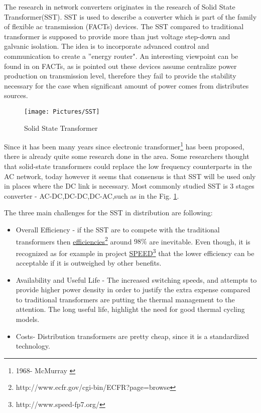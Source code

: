 \documentclass[]{scrartcl}
\begin{document}
The research in network converters originates in the research of Solid State Transformer(SST). SST is used to describe a converter which is part of the family of flexible ac transmission (FACTs) devices. The SST compared to traditional transformer is supposed to provide more than just voltage step-down and galvanic isolation. The idea is to incorporate advanced control and communication to create a ''energy router"\cite{She2012}. An interesting viewpoint can be found in \cite{Doncker2014} on FACTs, as is pointed out these devices assume centralize power production on transmission level, therefore they fail to provide the stability necessary for the case when significant amount of power comes from distributes sources.


\begin{figure}[h!]
	\centering
	\texttt{[image: Pictures/SST]}
	\caption{Solid State Transformer}
	\label{fig:SST}
\end{figure}

Since it has been many years since electronic transformer\footnote{1968- McMurray \cite{McMurray1971}} has been proposed, there is already quite some research done in the area. Some researchers thought that solid-state transformers could replace the low frequency counterparts in the AC network, today however it seems that consensus is that SST will be used only in places where the DC link is necessary\cite{Kolar2014d}. Most commonly studied SST is 3 stages converter - AC-DC,DC-DC,DC-AC,such as in the Fig. \ref{fig:SST}. 



The three main challenges for the SST in distribution are following\cite{Huang2013}:
\begin{itemize}
	\item Overall Efficiency - if the SST are to compete with the traditional transformers then \href{<http://www.ecfr.gov/cgi-bin/ECFR?page=browse>}{efficiencies}\footnote{http://www.ecfr.gov/cgi-bin/ECFR?page=browse} around $98\%$ are inevitable. Even though, it is recognized as for example in project \href{<http://www.speed-fp7.org/>}{SPEED}\footnote{http://www.speed-fp7.org/} that the lower efficiency can be acceptable if it is outweighed by other benefits.
	\item Availability and Useful Life - The increased switching speeds, and attempts to provide higher power density in order to justify the extra expense compared to traditional transformers are putting the thermal management to the attention. The long useful life, highlight the need for good thermal cycling models.
	\item Costs- Distribution transformers are pretty cheap, since it is a  standardized technology. 
\end{itemize}
\end{document}

